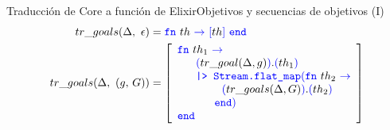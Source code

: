 \documentclass[14pt,aspectratio=169]{beamer}
\begin{document}
\begin{frame}{Traducción de Core a función de Elixir}{Objetivos y secuencias de objetivos (I)}
  \small \begin{align*}
    tr\_goals(\Delta,\ \epsilon) & = \textcolor{blue}{\texttt{fn}}\ th\ \textcolor{blue}{\rightarrow}\ \textcolor{blue}{[}th\textcolor{blue}{]}\ \textcolor{blue}{\texttt{end}}\\
    tr\_goals(\Delta,\ (g,\, G))   & = \left[
        \begin{array}{lrl}
          \textcolor{blue}{\texttt{fn}}\ th_1\ \textcolor{blue}{\rightarrow}\\
            \ \ \ \ \ \textcolor{blue}{(}tr\_goal(\Delta, g)\textcolor{blue}{)}.\textcolor{blue}{(}th_1\textcolor{blue}{)} \\
            \ \ \ \ \ \textcolor{blue}{\texttt{|>\ Stream.flat\_map}(\texttt{fn}}\ th_2\ \textcolor{blue}{\rightarrow }\\
            \ \ \ \ \ \ \ \ \ \ \ \ \textcolor{blue}{(} tr\_goals(\Delta, G) \textcolor{blue}{)}.\textcolor{blue}{(}th_2\textcolor{blue}{)}\\
            \ \ \ \ \ \ \ \ \ \ \textcolor{blue}{\texttt{end})}\\
            \textcolor{blue}{\texttt{end}}
        \end{array}
      \right]
  \end{align*}
\end{frame}
\end{document}
